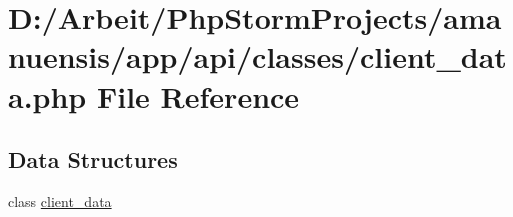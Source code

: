 \hypertarget{a00056}{}\section{D\+:/\+Arbeit/\+Php\+Storm\+Projects/amanuensis/app/api/classes/client\+\_\+data.php File Reference}
\label{a00056}
\subsection*{Data Structures}
\begin{DoxyCompactItemize}
\item 
class \hyperlink{a00017}{client\+\_\+data}
\end{DoxyCompactItemize}
